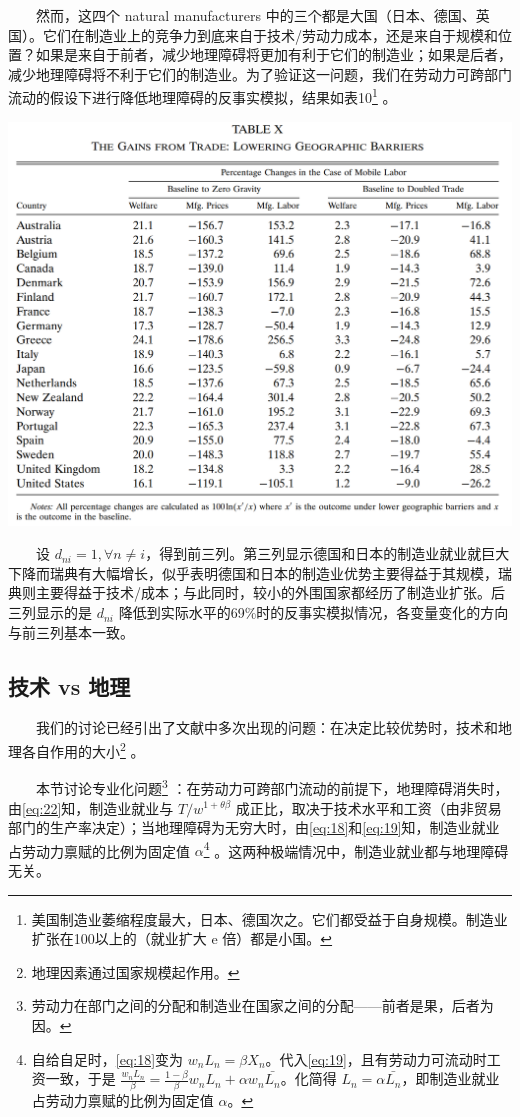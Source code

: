 \documentclass[
]{article}
\begin{document}
　　然而，这四个 natural manufacturers 中的三个都是大国（日本、德国、英国）。它们在制造业上的竞争力到底来自于技术/劳动力成本，还是来自于规模和位置？如果是来自于前者，减少地理障碍将更加有利于它们的制造业；如果是后者，减少地理障碍将不利于它们的制造业。为了验证这一问题，我们在劳动力可跨部门流动的假设下进行降低地理障碍的反事实模拟，结果如表10\footnote{美国制造业萎缩程度最大，日本、德国次之。它们都受益于自身规模。制造业扩张在100以上的（就业扩大 e 倍）都是小国。} 。

\begin{center}\includegraphics[width=1\linewidth]{Figures/Table10} \end{center}

　　设 \(d_{n i}=1, \forall n \neq i\)，得到前三列。第三列显示德国和日本的制造业就业就巨大下降而瑞典有大幅增长，似乎表明德国和日本的制造业优势主要得益于其规模，瑞典则主要得益于技术/成本；与此同时，较小的外围国家都经历了制造业扩张。后三列显示的是 \(d_{n i}\) 降低到实际水平的69\%时的反事实模拟情况，各变量变化的方向与前三列基本一致。

\hypertarget{ux6280ux672f-vs-ux5730ux7406}{%
\subsection{技术 vs 地理}\label{ux6280ux672f-vs-ux5730ux7406}}

　　我们的讨论已经引出了文献中多次出现的问题：在决定比较优势时，技术和地理各自作用的大小\footnote{地理因素通过国家规模起作用。} 。

　　本节讨论专业化问题\footnote{劳动力在部门之间的分配和制造业在国家之间的分配------前者是果，后者为因。} ：在劳动力可跨部门流动的前提下，地理障碍消失时，由\eqref{eq:22}知，制造业就业与 \(T/w^{1+\theta\beta}\) 成正比，取决于技术水平和工资（由非贸易部门的生产率决定）；当地理障碍为无穷大时，由\eqref{eq:18}和\eqref{eq:19}知，制造业就业占劳动力禀赋的比例为固定值 \(\alpha\)\footnote{自给自足时，\eqref{eq:18}变为 \(w_n L_n = \beta X_n\)。代入\eqref{eq:19}，且有劳动力可流动时工资一致，于是 \(\frac{w_n L_n}{\beta} = \frac{1-\beta}{\beta}w_n L_n+\alpha w_n \bar{L_n}\)。化简得 \(L_n = \alpha \bar{L_n}\)，即制造业就业占劳动力禀赋的比例为固定值 \(\alpha\)。} 。这两种极端情况中，制造业就业都与地理障碍无关。
\end{document}
